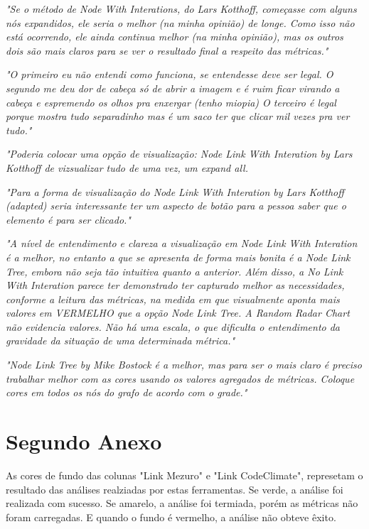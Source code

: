 \begin{anexosenv}
\textit{"Se o método de Node With Interations, do Lars Kotthoff, começasse com
alguns nós expandidos, ele seria o melhor (na minha opinião) de longe. Como
isso não está ocorrendo, ele ainda continua melhor (na minha opinião), mas os
outros dois são mais claros para se ver o resultado final a respeito das
métricas."}

\textit{"O primeiro eu não entendi como funciona, se entendesse deve ser legal. O
segundo me deu dor de cabeça só de abrir a imagem e é ruim ficar virando a
cabeça e espremendo os olhos pra enxergar (tenho miopia)  O terceiro é legal
porque mostra tudo separadinho mas é um saco ter que clicar mil vezes pra ver
tudo."}

\textit{"Poderia colocar uma opção de visualização: Node Link With Interation
by Lars Kotthoff de vizsualizar tudo de uma vez, um expand all.}

\textit{"Para a forma de visualização do Node Link With Interation by Lars
Kotthoff (adapted) seria interessante ter um aspecto de botão para a pessoa
saber que o elemento é para ser clicado."}

\textit{"A nível de entendimento e clareza a visualização em Node Link With
Interation é a melhor, no entanto a que se apresenta de forma mais bonita é a
Node Link Tree, embora não seja tão intuitiva quanto a anterior. Além disso, a
No Link With Interation parece ter demonstrado ter capturado melhor as
necessidades, conforme a leitura das métricas, na medida em que visualmente
aponta mais valores em VERMELHO que a opção Node Link Tree. A Random Radar
Chart não evidencia valores. Não há uma escala, o que dificulta
o entendimento da gravidade da situação de uma determinada métrica."}

\textit{"Node Link Tree by Mike Bostock é a melhor, mas para ser o mais claro é
preciso trabalhar melhor com as cores usando os valores agregados de métricas.
Coloque cores em todos os nós do grafo de acordo com o grade."}


\chapter{Segundo Anexo}
\label{chap:anexoB}

As cores de fundo das colunas "Link Mezuro" e "Link CodeClimate", represetam o
resultado das análises realziadas por estas ferramentas. Se verde, a análise foi
realizada com sucesso. Se amarelo, a análise foi termiada, porém as métricas não
foram carregadas. E quando o fundo é vermelho, a análise não obteve êxito.


\end{anexosenv}
